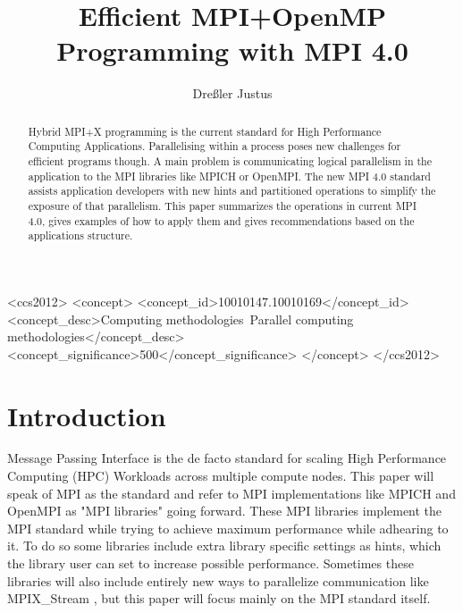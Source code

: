 \documentclass[sigconf]{acmart}
\begin{document}
\title{Efficient MPI+OpenMP Programming with MPI 4.0}
\author{Dreßler Justus}


\begin{CCSXML}
    <ccs2012>
    <concept>
    <concept_id>10010147.10010169</concept_id>
    <concept_desc>Computing methodologies~Parallel computing methodologies</concept_desc>
    <concept_significance>500</concept_significance>
    </concept>
    </ccs2012>
\end{CCSXML}


\begin{abstract}

    Hybrid MPI+X programming is the current standard for High Performance Computing Applications.
    Parallelising within a process poses new challenges for efficient programs though.
    A main problem is communicating logical parallelism in the application to the MPI libraries like MPICH or OpenMPI.
    The new MPI 4.0 standard assists application developers with new hints and partitioned operations to simplify the exposure of that parallelism.
    This paper summarizes the operations in current MPI 4.0, gives examples of how to apply them and gives recommendations based on the applications structure.


\end{abstract}

\maketitle

\section{Introduction}

Message Passing Interface is the de facto standard for scaling High Performance Computing (HPC) Workloads across multiple compute nodes.
This paper will speak of MPI as the standard and refer to MPI implementations like MPICH and OpenMPI as "MPI libraries" going forward.
These MPI libraries implement the MPI standard while trying to achieve maximum performance while adhearing to it.
To do so some libraries include extra library specific settings as hints, which the library user can set to increase possible performance.
Sometimes these libraries will also include entirely new ways to parallelize communication like MPIX\_Stream \cite{Zhou2022}, but this paper will focus mainly on the MPI standard itself.
\end{document}
